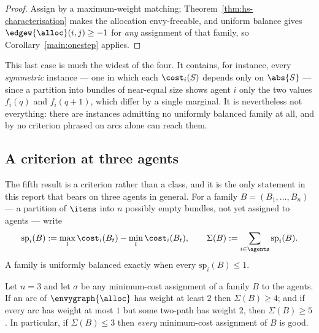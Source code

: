 \begin{proof}
Assign by a maximum-weight matching; Theorem~\ref{thm:hs-characterisation} makes
the allocation envy-freeable, and uniform balance gives
$\edgew{\alloc}(i,j) \ge -1$ for \emph{any} assignment of that family, so
Corollary~\ref{main:onestep} applies.
\end{proof}

This last case is much the widest of the four. It contains, for instance, every
\emph{symmetric} instance --- one in which each $\cost_i(S)$ depends only on
$\abs{S}$ --- since a partition into bundles of near-equal size shows agent $i$
only the two values $f_i(q)$ and $f_i(q+1)$, which differ by a single marginal.
It is nevertheless not everything: there are instances admitting no uniformly
balanced family at all, and by  no criterion phrased on
arcs alone can reach them.

\subsection{A criterion at three agents}
\label{sec:main-spread}

The fifth result is a criterion rather than a class, and it is the only
statement in this report that bears on three agents in general. For a family
$B = (B_1,\dots,B_n)$ --- a partition of $\items$ into $n$ possibly empty
bundles, not yet assigned to agents --- write
\[
  \mathrm{sp}_i(B) := \max_t \cost_i(B_t) - \min_t \cost_i(B_t),
  \qquad
  \Sigma(B) := \sum_{i \in \agents}\mathrm{sp}_i(B) .
\]
A family is uniformly balanced exactly when every $\mathrm{sp}_i(B) \le 1$.

\begin{theorem}
\label{main:sigma3}
Let $n = 3$ and let $\sigma$ be any minimum-cost assignment of a family $B$ to
the agents. If an arc of $\envygraph{\alloc}$ has weight at least $2$ then
$\Sigma(B) \ge 4$; and if every arc has weight at most $1$ but some two-path has
weight $2$, then $\Sigma(B) \ge 5$. In particular, if $\Sigma(B) \le 3$ then
\emph{every} minimum-cost assignment of $B$ is good.
\end{theorem}


